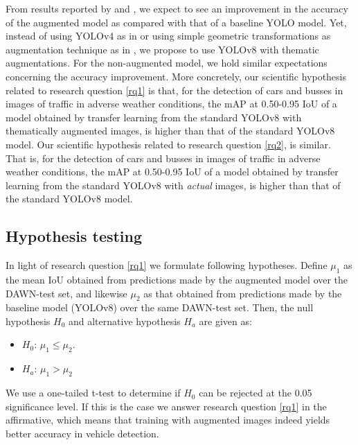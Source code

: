 \documentclass[]{article}
\begin{document}
	From results reported by \cite{kumarObjectDetectionAdverse2023} and \cite{liVehicleDetectionFoggy2022}, we expect to see an improvement in the accuracy of the augmented model as compared with that of a baseline YOLO model. Yet, instead of using YOLO{\small v4} as in \cite{liVehicleDetectionFoggy2022} or using simple geometric transformations as augmentation technique as in \cite{kumarObjectDetectionAdverse2023}, we propose to use YOLO{\small v8} with thematic augmentations. For the non-augmented model, we hold similar expectations concerning the accuracy improvement. More concretely, our scientific hypothesis related to research question \ref{rq1} is that, for the detection of cars and busses in images of traffic in adverse weather conditions, the mAP at 0.50-0.95 IoU of a model obtained by transfer learning from the standard YOLO{\small v8} with thematically augmented images, is higher than that of the standard YOLO{\small v8} model. Our scientific hypothesis related to research question \ref{rq2}, is similar. That is, for the detection of cars and busses in images of traffic in adverse weather conditions, the mAP at 0.50-0.95 IoU of a model obtained by transfer learning from the standard YOLO{\small v8} with  \textit{actual} images, is higher than that of the standard YOLO{\small v8} model.

\subsection{Hypothesis testing}
	
	In light of research question \ref{rq1} we formulate following hypotheses. Define $\mu_1$ as the mean IoU obtained from predictions made by the augmented model over the DAWN-test set, and likewise $\mu_2$ as that obtained from predictions made by the baseline model (YOLO{\small v8}) over the same DAWN-test set. Then, the null hypothesis $H_0$ and alternative hypothesis $H_a$ are given as:
	
	\begin{itemize}
		\item $H_0$: $\mu_1 \le \mu_2$. 
		\item $H_a$: $\mu_1 > \mu_2$
	\end{itemize}
	
	We use a one-tailed t-test to determine if $H_0$ can be rejected at the 0.05 significance level. If this is the case we answer research question \ref{rq1} in the affirmative, which means that training with augmented images indeed yields better accuracy in vehicle detection. 
	
\end{document}
